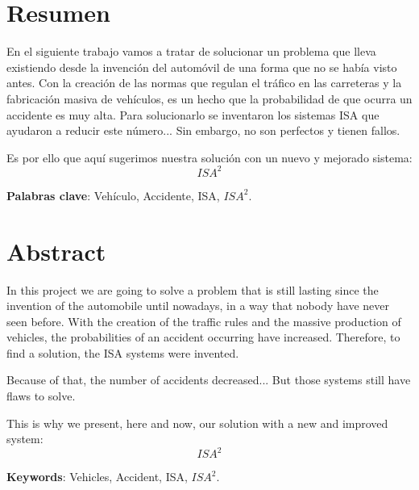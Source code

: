 \chapter{Resumen}

En el siguiente trabajo vamos a tratar de solucionar un problema que lleva existiendo desde la invención del automóvil de una forma que no se había visto antes. Con la creación de las normas que regulan el tráfico en las carreteras y la fabricación masiva de vehículos, es un hecho que la probabilidad de que ocurra un accidente es muy alta. Para solucionarlo se inventaron los sistemas \ac{ISA} \cite{reduccion} que ayudaron a reducir este número... Sin embargo, no son perfectos y tienen fallos.

Es por ello que aquí sugerimos nuestra solución con un nuevo y mejorado sistema: \[ISA^{2}\]

\vspace{0.5cm}

\textbf{Palabras clave}: Vehículo, Accidente, \ac{ISA}, $ISA^{2}$.

\newpage
\thispagestyle{empty}
\hspace*{0.5cm}
\newpage

\chapter{Abstract}

In this project we are going to solve a problem that is still lasting since the invention of the automobile until nowadays, in a way that nobody have never seen before. With the creation of the traffic rules and the massive production of vehicles, the probabilities of an accident occurring have increased. Therefore, to find a solution, the \ac{ISA} systems were invented.

Because of that, the number of accidents decreased... But those systems still have flaws to solve.

This is why we present, here and now, our solution with a new and improved system: \[ISA^{2}\]

\vspace{0.5cm}

\textbf{Keywords}: Vehicles, Accident, \ac{ISA}, $ISA^{2}$.
\newpage
\thispagestyle{empty}
\hspace*{0.5cm}
\newpage